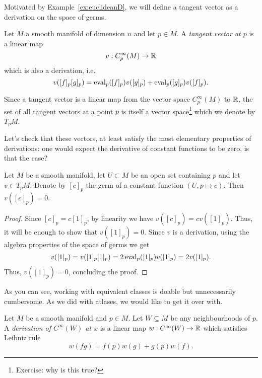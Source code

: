 Motivated by Example~\ref{ex:euclideanD}, we will define a tangent vector as a derivation on the space of germs.

\begin{definition}
  Let $M$ a smooth manifold of dimension $n$ and let $p\in M$.
  A \emph{tangent vector at $p$} is a linear map
  \begin{equation}\label{def:tangentvector}
    v: C_p^\infty(M)\to\mathbb{R}
  \end{equation}
  which is also a derivation, i.e.
  \begin{equation}
    v([f]_p [g]_p) =
      \operatorname{eval}_p([f]_p)v([g]_p)
      + \operatorname{eval}_p([g]_p)v([f]_p).
  \end{equation}

  Since a tangent vector is a linear map from the vector space $C_p^\infty(M)$ to $\mathbb{R}$, the set of all tangent vectors at a point $p$ is itself a vector space\footnote{Exercise: why is this true?} which we denote by $T_p M$.
\end{definition}

Let's check that these vectors, at least satisfy the most elementary properties of derivations: one would expect the derivative of constant functions to be zero, is that the case?

\begin{lemma}\label{lem:f'0is0forconst}
  Let $M$ be a smooth manifold, let $U\subset M$ be an open set containing $p$ and let $v\in T_p M$.
  Denote by $[c]_p$ the germ of a constant function $(U, p \mapsto c)$.
  Then $v([c]_p) = 0$.
\end{lemma}
\begin{proof}
  Since $[c]_p = c [1]_p$, by linearity we have $v([c]_p) = c v([1]_p)$.
  Thus, it will be enough to show that $v([1]_p) = 0$.
  Since $v$ is a derivation, using the algebra properties of the space of germs we get
  \begin{equation}
    v([1]_p) = v([1]_p [1]_p) = 2 \operatorname{eval}_p([1]_p)v([1]_p) = 2 v([1]_p).
  \end{equation}
  Thus, $v([1]_p) = 0$, concluding the proof.
\end{proof}

As you can see, working with equivalent classes is doable but unnecessarily cumbersome. As we did with atlases, we would like to get it over with.

\begin{definition}
  Let $M$ be a smooth manifold and $p\in M$.
  Let $W\subseteq M$ be any neighbourhoods of $p$.
  A \emph{derivation of $C^\infty(W)$ at $x$} is a linear map $w:C^\infty(W)\to\mathbb{R}$ which satisfies Leibniz rule
  \begin{equation}
    w(fg) = f(p)w(g) + g(p)w(f).
  \end{equation}
\end{definition}

